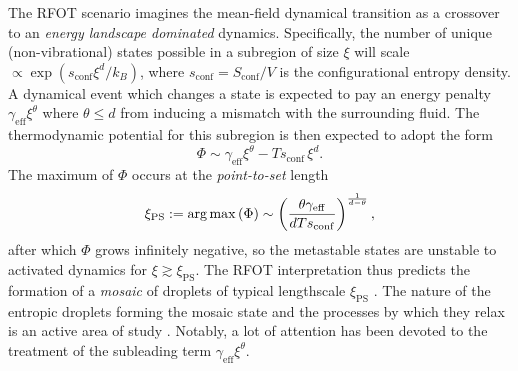 \documentclass[11pt,twoside]{report}
\begin{document}
The RFOT scenario imagines the mean-field dynamical transition as a crossover to an \emph{energy landscape dominated} dynamics.
Specifically, the number of unique (non-vibrational) states possible in a subregion of size $\xi$ will scale $\propto \exp{(s_\mathrm{conf} \xi^d / k_B)}$, where $s_\mathrm{conf} = S_\mathrm{conf} / V$ is the configurational entropy density.
A dynamical event which changes a state is expected to pay an energy penalty $\gamma_\mathrm{eff} \xi^\theta$ where $\theta \le d$ from inducing a mismatch with the surrounding fluid.
The thermodynamic potential for this subregion is then expected to adopt the form
\begin{equation}\label{eq:rfot-barrier}
  \Phi \sim \gamma_\mathrm{eff} \xi^\theta - T s_\mathrm{conf} \, \xi^d.
\end{equation}
The maximum of $\Phi$ occurs at the \emph{point-to-set}%
length
\begin{equation}\label{eq:rfot-xi}
  \xi_\mathrm{PS}
  := \operatorname*{arg\,max}{(\Phi)}
  \sim
  \left(
  \frac{\theta \gamma_\mathrm{eff}}{d T s_\mathrm{conf}}
  \right)^\frac{1}{d-\theta},
\end{equation}
after which $\Phi$ grows infinitely negative, so the metastable states are unstable to activated dynamics for $\xi \gtrsim \xi_\mathrm{PS}$.
The RFOT interpretation thus predicts the formation of a \emph{mosaic} of droplets of typical lengthscale $\xi_\mathrm{PS}$ \cite{KirkpatrickPRB1987,HallJCP1987,KirkpatrickPRA1989,BouchaudJCP2004}.
The nature of the entropic droplets forming the mosaic state and the processes by which they relax is an active area of study \cite{BouchaudJCP2004,DzeroPRB2005,FranzJSM2005,AngeliniJSP2017,RulquinJSM2016,BiroliMeanPRB2018,BiroliFinitePRB2018}.
Notably, a lot of attention has been devoted to the treatment of the subleading term $\gamma_\mathrm{eff} \xi^\theta$.
\end{document}
